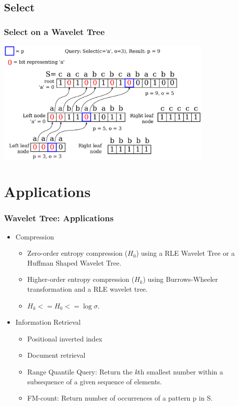 \documentclass{beamer}
\begin{document}

\subsection{Select}
\begin{frame}
\frametitle{Select on a Wavelet Tree}
\begin{center}
	\includegraphics[width=0.8\textwidth]{SelectDrawing}
\end{center}
\end{frame}

\section{Applications}
\begin{frame}
\frametitle{Wavelet Tree: Applications}
\begin{itemize}
\item Compression
	\begin{itemize}
	\item Zero-order entropy compression ($H_0$) using a RLE Wavelet Tree or a Huffman Shaped Wavelet Tree.
	\item Higher-order entropy compression ($H_k$) using Burrows-Wheeler transformation and a RLE wavelet tree.
	\item $H_k <= H_0 <= \log \sigma$.
	\end{itemize}
\item Information Retrieval
	\begin{itemize}
	\item Positional inverted index
	\item Document retrieval
	\item Range Quantile Query: Return the \textit{k}th smallest number within a subsequence of a given sequence of elements.
	\item FM-count: Return number of occurrences of a pattern p in S. 
	\end{itemize}
\end{itemize}
\end{frame}
\end{document}
